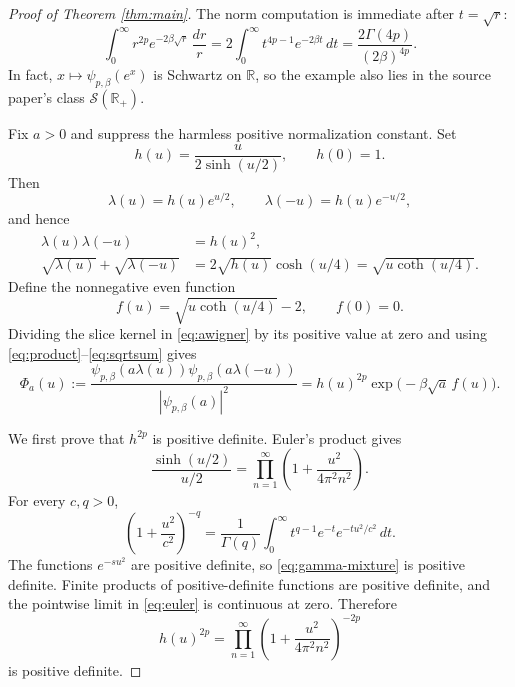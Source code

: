 \documentclass[11pt]{article}
\newcommand{\R}{\mathbb R}
\begin{document}
\begin{proof}[Proof of Theorem \ref{thm:main}]
The norm computation is immediate after \(t=\sqrt r\):
\[
 \int_0^\infty r^{2p}e^{-2\beta\sqrt r}\,\frac{dr}{r}
 =2\int_0^\infty t^{4p-1}e^{-2\beta t}\,dt
 =\frac{2\Gamma(4p)}{(2\beta)^{4p}}.
\]
In fact, \(x\mapsto\psi_{p,\beta}(e^x)\) is Schwartz on \(\R\), so the
example also lies in the source paper's class \(\mathcal S(\R_+)\).

Fix \(a>0\) and suppress the harmless positive normalization constant. Set
\begin{equation}\label{eq:hdef}
 h(u)=\frac{u}{2\sinh(u/2)},\qquad h(0)=1.
\end{equation}
Then
\[
 \lambda(u)=h(u)e^{u/2},\qquad
 \lambda(-u)=h(u)e^{-u/2},
\]
and hence
\begin{align}
 \lambda(u)\lambda(-u)&=h(u)^2,\label{eq:product}\\
 \sqrt{\lambda(u)}+\sqrt{\lambda(-u)}
 &=2\sqrt{h(u)}\cosh(u/4)
  =\sqrt{u\coth(u/4)}.\label{eq:sqrtsum}
\end{align}
Define the nonnegative even function
\begin{equation}\label{eq:fdef}
 f(u)=\sqrt{u\coth(u/4)}-2,\qquad f(0)=0.
\end{equation}
Dividing the slice kernel in \eqref{eq:awigner} by its positive value at zero
and using \eqref{eq:product}--\eqref{eq:sqrtsum} gives
\begin{equation}\label{eq:factorization}
 \Phi_a(u):=
 \frac{\psi_{p,\beta}(a\lambda(u))
       \psi_{p,\beta}(a\lambda(-u))}
      {|\psi_{p,\beta}(a)|^2}
 =h(u)^{2p}\exp\bigl(-\beta\sqrt a\,f(u)\bigr).
\end{equation}

We first prove that \(h^{2p}\) is positive definite. Euler's product gives
\begin{equation}\label{eq:euler}
 \frac{\sinh(u/2)}{u/2}
 =\prod_{n=1}^\infty
 \left(1+\frac{u^2}{4\pi^2n^2}\right).
\end{equation}
For every \(c,q>0\),
\begin{equation}\label{eq:gamma-mixture}
 \left(1+\frac{u^2}{c^2}\right)^{-q}
 =\frac1{\Gamma(q)}\int_0^\infty
 t^{q-1}e^{-t}e^{-tu^2/c^2}\,dt.
\end{equation}
The functions \(e^{-s u^2}\) are positive definite, so
\eqref{eq:gamma-mixture} is positive definite. Finite products of
positive-definite functions are positive definite, and the pointwise limit in
\eqref{eq:euler} is continuous at zero. Therefore
\begin{equation}\label{eq:first-pd}
 h(u)^{2p}=\prod_{n=1}^\infty
 \left(1+\frac{u^2}{4\pi^2n^2}\right)^{-2p}
\end{equation}
is positive definite.


\end{proof}
\end{document}
